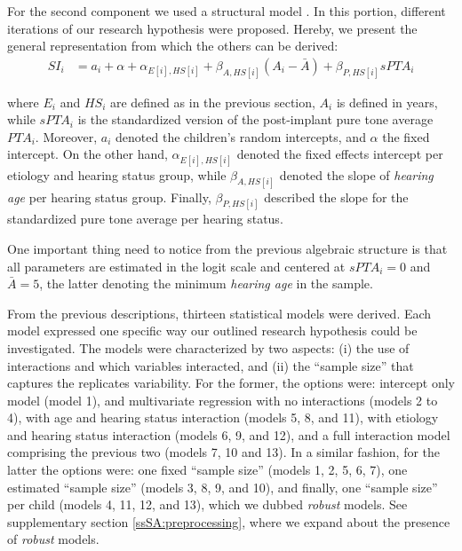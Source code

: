 For the second component we used a structural model \cite{Hoyle_et_al_2014}. In this portion, different iterations of our research hypothesis were proposed. Hereby, we present the general representation from which the others can be derived:
%
\begin{align}
	SI_{i} & = a_{i} + \alpha + \alpha_{E[i], HS[i]} + \beta_{A, HS[i]} (A_{i} - \bar{A}) + \beta_{P, HS[i]} sPTA_{i} 
\end{align}

\noindent where $E_{i}$ and $HS_{i}$ are defined as in the previous section, $A_{i}$ is defined in years, while $sPTA_{i}$ is the standardized version of the post-implant pure tone average $PTA_{i}$. Moreover, $a_{i}$ denoted the children's random intercepts, and $\alpha$ the fixed intercept. On the other hand,  $\alpha_{E[i],HS[i]}$ denoted the fixed effects intercept per etiology and hearing status group, while $\beta_{A, HS[i]}$ denoted the slope of \textit{hearing age} per hearing status group. Finally, $\beta_{P, HS[i]}$ described the slope for the standardized pure tone average per hearing status. 

One important thing need to notice from the previous algebraic structure is that all parameters are estimated in the logit scale and centered at $sPTA_{i}=0$ and $\bar{A}=5$, the latter denoting the minimum \textit{hearing age} in the sample.

From the previous descriptions, thirteen statistical models were derived. Each model expressed one specific way our outlined research hypothesis could be investigated. The models were characterized by two aspects: (i) the use of interactions and which variables interacted, and (ii) the ``sample size'' that captures the replicates variability. For the former, the options were: intercept only model (model 1), and multivariate regression with no interactions (models 2 to 4), with age and hearing status interaction (models 5, 8, and 11), with etiology and hearing status interaction (models 6, 9, and 12), and a full interaction model comprising the previous two (models 7, 10 and 13). In a similar fashion, for the latter the options were: one fixed ``sample size'' (models 1, 2, 5, 6, 7), one estimated ``sample size'' (models 3, 8, 9, and 10), and finally, one ``sample size'' per child (models 4, 11, 12, and 13), which we dubbed \textit{robust} models. See supplementary section \ref{ssSA:preprocessing}, where we expand about the presence of \textit{robust} models. 

